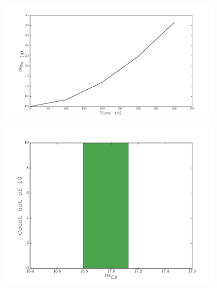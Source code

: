 \documentclass{beamer}
\begin{document}
\begin{frame}
    \begin{figure}[H]
    \begin{center}
      \includegraphics[width=0.77\columnwidth]{../Origen2/PLOTS/BA136Post_XY.pdf}
      \vspace{-5mm}
      \label{fig:POSTXYBa136}
    \end{center}
  \end{figure}
\end{frame}
    
\begin{frame}
  \begin{figure}[H]
    \begin{center}
      \includegraphics[width=0.77\columnwidth]{../Origen2/PLOTS/CS134Post_HIST.pdf}
      \vspace{-5mm}
      \label{fig:POSTHISTBa136}
    \end{center}
  \end{figure}
\end{frame}
  
\end{document}
